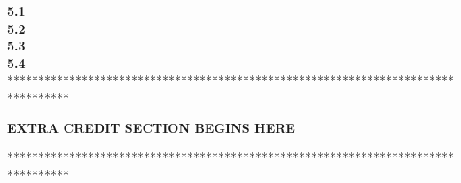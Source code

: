\documentclass[12pt]{article}
\newcommand\tab[1][1cm]{\hspace*{#1}}
\begin{document}
\pagebreak
\textbf{5.1} \\



\pagebreak
\textbf{5.2} \\



\pagebreak
\textbf{5.3} \\



\pagebreak
\textbf{5.4} \\




\pagebreak
**********************************************************************************

\tab\tab\tab \textbf{EXTRA CREDIT SECTION BEGINS HERE}

**********************************************************************************
\end{document}
